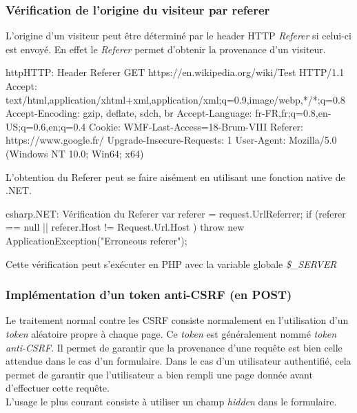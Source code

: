 \subsubsection{Vérification de l'origine du visiteur par referer}
L'origine d'un visiteur peut être déterminé par le header \gls{HTTP} \textit{\gls{Referer}} si celui-ci est envoyé. En effet le \textit{\gls{Referer}} permet d'obtenir la provenance d'un visiteur.
\begin{Config}{http}{HTTP: Header Referer}
GET https://en.wikipedia.org/wiki/Test HTTP/1.1
Accept: text/html,application/xhtml+xml,application/xml;q=0.9,image/webp,*/*;q=0.8
Accept-Encoding: gzip, deflate, sdch, br
Accept-Language: fr-FR,fr;q=0.8,en-US;q=0.6,en;q=0.4
Cookie: WMF-Last-Access=18-Brum-VIII
Referer: https://www.google.fr/
Upgrade-Insecure-Requests: 1
User-Agent: Mozilla/5.0 (Windows NT 10.0; Win64; x64) 
\end{Config}

L'obtention du \gls{Referer} peut se faire aisément en utilisant une fonction native de .NET.

\begin{Config}{csharp}{.NET: Vérification du Referer}
var referer = request.UrlReferrer;
if (referer == null || referer.Host != Request.Url.Host )
	throw new ApplicationException("Erroneous referer");
\end{Config}

Cette vérification peut s'exécuter en PHP avec la variable globale \textit{\$\_SERVER}

\subsubsection{Implémentation d'un token anti-CSRF (en POST)}
Le traitement normal contre les \gls{CSRF} consiste normalement en l'utilisation d'un \textit{token} aléatoire propre à chaque page. Ce \textit{token} est généralement nommé \textit{token anti-CSRF}. Il permet de garantir que la provenance d'une requête est bien celle attendue dans le cas d'un formulaire. Dans le cas d'un utilisateur authentifié, cela permet de garantir que l'utilisateur a bien rempli une page donnée avant d'effectuer cette requête. \\
L'usage le plus courant consiste à utiliser un champ \textit{hidden} dans le formulaire. 

